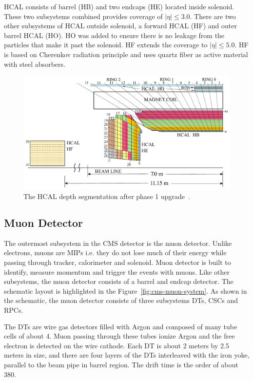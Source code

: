 \gls{HCAL} consists of barrel (HB) and two endcaps (HE) located inside solenoid.
These two subsystems combined provides
coverage of \( |\eta| \le 3.0 \).
There are two other subsystems of \gls{HCAL} outside solenoid,
a forward \gls{HCAL} (HF) and outer barrel \gls{HCAL} (HO).
HO was added to ensure there is no leakage from the particles that
make it past the solenoid. HF extends the coverage
to \(|\eta| \le 5.0\). HF is based on Cherenkov radiation principle
and uses quartz fiber as active material with steel absorbers.

\begin{figure}[!ht]
  \centering
  \includegraphics[width=\textwidth]{figures/cms_hcal_depth_seg.pdf}
  \caption[The \gls{HCAL} depth segmentation after phase 1 upgrade]%
  {The \gls{HCAL} depth segmentation after phase 1 upgrade~\cite{image-cms-hcal-depth}.}%
  \label{fig:cms-hcal-depth}
\end{figure}

\subsection{
  Muon Detector
}

The outermost subsystem in the \gls{CMS} detector is the muon detector.
Unlike electrons, muons are \glspl{MIP} i.e.
they do not lose much of their energy
while passing through tracker, calorimeter and solenoid.
Muon detector is built to identify, measure momentum and trigger the events
with muons. Like other subsystems, the muon detector consists of a barrel and endcap
detector. The schematic layout is highlighted in the Figure~\ref{fig:cms-muon-system}.
As shown in the schematic, the muon detector consists of three subsystems \glspl{DT}, \glspl{CSC} and
\glspl{RPC}.

The \glspl{DT} are wire gas detectors filled with Argon and composed of
many tube cells of about 4\cm{}. Muon passing through these tubes
ionize Argon and the free electron is detected on the wire cathode.
Each DT is about 2 meters by 2.5 meters in size, and there are four layers
of the \glspl{DT} interleaved with the iron yoke, parallel to
the beam pipe in barrel region. The drift time is the order of about 380\nanoseconds.

